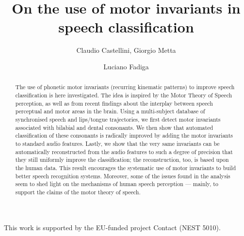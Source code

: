 \documentclass{pnastwo}
\begin{document}
\title{On the use of motor invariants in speech classification}

\author{
Claudio Castellini,
Giorgio Metta \and
Luciano Fadiga
}


\maketitle

\begin{article}

\begin{abstract}

  The use of phonetic motor invariants (recurring kinematic patterns)
  to improve speech classification is here investigated. The
  idea is inspired by the Motor Theory of Speech perception, as well as
  from recent findings about the interplay between speech
  perceptual and motor areas in the brain. Using a multi-subject database
  of synchronised speech and lips/tongue trajectories, we first detect
  motor invariants associated with bilabial and dental consonants.
  We then show that automated classification of these
  consonants is radically improved by adding the motor invariants to
  standard audio features. Lastly, we show that the very same invariants can be
  automatically reconstructed from the audio features to such a degree of
  precision that they still uniformly improve the classification; the
  reconstruction, too, is based upon the human data.
  This result encourages the systematic use of motor invariants to build
  better speech recognition systems. Moreover, some of the issues found in
  the analysis seem to shed light on the mechanisms of human speech perception
  --- mainly, to support the claims of the motor theory of speech.
  
\end{abstract}










\begin{acknowledgments}
  This work is supported by the EU-funded project Contact (NEST 5010).
\end{acknowledgments}

%

\end{article}
\end{document}
